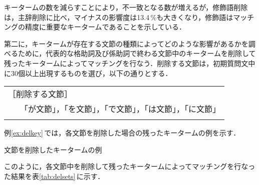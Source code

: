 キータームの数を減らすことにより，不一致となる数が増えるが，修飾語削除は，主辞削除に比べ，マイナスの影響度は13.4\,\%も大きくなり，修飾語はマッチングの精度に重要なキータームであることを示している．

第二に，キータームが存在する文節の種類によってどのような影響があるかを調べるために，代表的な格助詞及び係助詞で終わる文節中のキータームを削除して残ったキータームによってマッチングを行なう．削除する文節は，初期質問文中に30個以上出現するものを選び，以下の通りとする．

\begin{tabular}{ll}
 \\
 \multicolumn{2}{l}{［削除する文節］} \\
 ~ & 「が文節」，「を文節」，「で文節」，「は文節」，「に文節」\\
 \\
\end{tabular}

例\ref{ex:delkey}\,では，各文節を削除した場合の残ったキータームの例を示す．

\begin{example}[ht]
 \begin{center}
 \end{center}
 \caption{文節を削除したキータームの例}
 \label{ex:delkey}
\end{example}


このように，各文節中を削除して残ったキータームによってマッチングを行なった結果を表\ref{tab:delsets}\,に示す．

